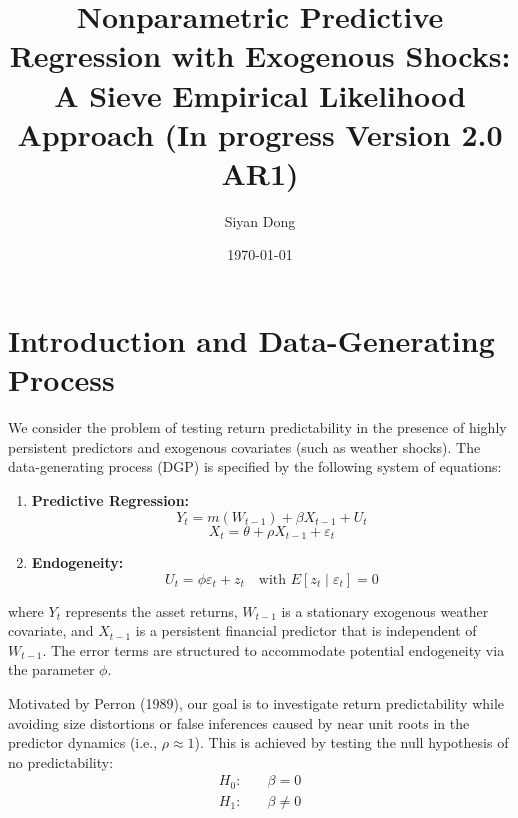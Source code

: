 \documentclass{article}
\begin{document}
\title{Nonparametric Predictive Regression with Exogenous Shocks: A Sieve Empirical Likelihood Approach (In progress Version 2.0 AR1)}
\author{Siyan Dong}
\date{\today}
\maketitle

\section{Introduction and Data-Generating Process}

We consider the problem of testing return predictability in the presence of highly persistent predictors and exogenous covariates (such as weather shocks). The data-generating process (DGP) is specified by the following system of equations:

\begin{enumerate}
    \item \textbf{Predictive Regression:}
    \begin{equation}
        Y_t = m(W_{t-1}) + \beta X_{t-1} + U_t
    \end{equation}
    \begin{equation}
        X_t = \theta + \rho X_{t-1} + \varepsilon_t
    \end{equation}
    
    \item \textbf{Endogeneity:}
    \begin{equation}
        U_t = \phi \varepsilon_t + z_t \quad \text{with } E[z_t \mid \varepsilon_t] = 0
    \end{equation}
\end{enumerate}
where $Y_t$ represents the asset returns, $W_{t-1}$ is a stationary exogenous weather covariate, and $X_{t-1}$ is a persistent financial predictor that is independent of $W_{t-1}$. The error terms are structured to accommodate potential endogeneity via the parameter $\phi$.

Motivated by Perron (1989), our goal is to investigate return predictability while avoiding size distortions or false inferences caused by near unit roots in the predictor dynamics (i.e., $\rho \approx 1$). This is achieved by testing the null hypothesis of no predictability:
\begin{equation} 
\begin{aligned}
    H_0: \quad &\beta = 0 \\
    H_1: \quad &\beta \neq 0
\end{aligned}
\end{equation}
\end{document}
